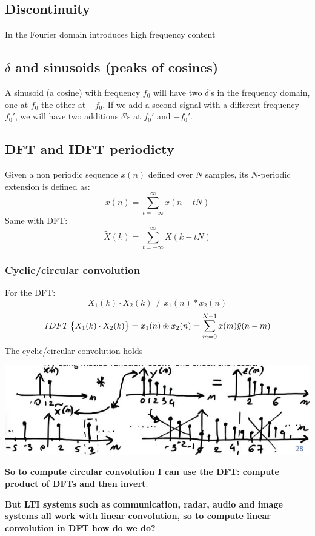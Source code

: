 \subsection{Discontinuity}
In the Fourier domain introduces high frequency content

\subsection{$\delta$ and sinusoids (peaks of cosines)}
A sinusoid (a cosine) with frequency $f_0$ will have two $\delta$'s in the frequency domain, one at $f_0$ the other at $-f_0$. If we add a second signal with a different frequency $f_0'$, we will have two additions $\delta$'s at $f_0'$ and $-f_0'$.

\subsection{DFT and IDFT periodicty}
Given a non periodic sequence $x(n)$ defined over $N$ samples, its $N$-periodic extension is defined as:
$$
\tilde{x}(n)=\sum_{t=-\infty}^\infty x(n-tN)
$$
Same with DFT:
$$
\tilde{X}(k)=\sum_{t=-\infty}^\infty X(k-tN)
$$

\subsubsection{Cyclic/circular convolution}
For the DFT:
$$
X_1(k)\cdot X_2(k) \neq x_1(n)* x_2(n)
$$
$$
IDFT\begin{Bmatrix} {X_1(k)\cdot X_2(k)} \end{Bmatrix}= x_1(n)\circledast x_2(n)=\sum_{m=0}^{N-1}x(m)\tilde{y}(n-m)
$$
The cyclic/circular convolution holds
\begin{center}
    \includegraphics[width=1\textwidth]{images/cyclic_conv.png}
\end{center}
\textbf{So to compute circular convolution I can use the DFT: compute product of DFTs and then invert}.

\textbf{But LTI systems such as communication, radar, audio and image systems all work with linear convolution, so to compute linear convolution in DFT how do we do?}

